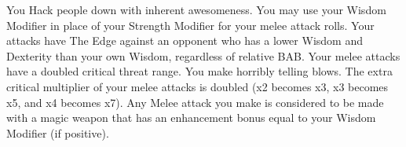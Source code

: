 {You Hack people down with inherent awesomeness.}
{You may use your Wisdom Modifier in place of your Strength Modifier for your melee attack rolls.}
{Your attacks have The Edge against an opponent who has a lower Wisdom and Dexterity than your own Wisdom, regardless of relative BAB.}
{Your melee attacks have a doubled critical threat range.}
{You make horribly telling blows. The extra critical multiplier of your melee attacks is doubled (x2 becomes x3, x3 becomes x5, and x4 becomes x7).}
{Any Melee attack you make is considered to be made with a magic weapon that has an enhancement bonus equal to your Wisdom Modifier (if positive).}